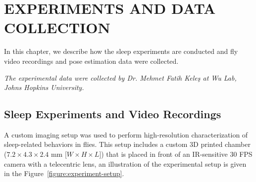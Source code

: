 \setlength{\parindent}{0pt}
\chapter{\bf EXPERIMENTS AND DATA COLLECTION}\label{chapter:expt-data-collection}
In this chapter, we describe how the sleep experiments are conducted and fly video recordings and pose estimation data were collected.

\textit{The experimental data were collected by Dr.
	Mehmet Fatih Keleş at Wu Lab, Johns Hopkins University.}

\section{Sleep Experiments and Video Recordings}
A custom imaging setup was used to perform high-resolution characterization of sleep-related behaviors in flies.
This setup includes a custom 3D printed chamber ($7.2 \times 4.3 \times 2.4$ mm [$W \times H \times L$]) that is placed in front of an IR-sensitive 30 FPS camera with a telecentric lens, an illustration of the experimental setup is given in the Figure~\ref{figure:experiment-setup}.

